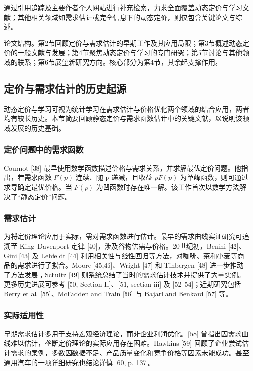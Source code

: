 通过引用追踪及主要作者个人网站进行补充检索，力求全面覆盖动态定价与学习文献；其他相关领域如需求估计或完全信息下的动态定价，则仅包含关键论文与综述。

论文结构。第2节回顾定价与需求估计的早期工作及其应用局限；第3节概述动态定价的一般文献与发展；第4节聚焦动态定价与学习的专门研究；第5节讨论与其他领域的联系；第6节展望新研究方向。核心部分为第4节，其余起支撑作用。


\subsection{定价与需求估计的历史起源}\label{historical-origins-of-pricing-and-demand-estimation}

动态定价与学习可视为统计学习在需求估计与价格优化两个领域的结合应用，两者均有较长历史。本节简要回顾静态定价与需求函数估计中的关键文献，以说明该领域发展的历史基础。

\subsubsection{定价问题中的需求函数}\label{demand-functions-in-pricing-problems}

Cournot [38] 最早使用数学函数描述价格与需求关系，并求解最优定价问题。他指出，若需求函数 \(F(p)\) 连续、随 p 递减，且收益 \(pF(p)\) 为单峰函数，则可通过求导确定最优价格。当 \(F(p)\) 为凹函数时存在唯一解。该工作首次以数学方法解决了“静态定价”问题。

\subsubsection{需求估计}\label{demand-estimation}

为将定价理论应用于实际，需对需求函数进行估计。最早的需求曲线实证研究可追溯至 King–Davenport 定律 [40]，涉及谷物供需与价格。20世纪初，Benini [42]、Gini [43] 及 Lehfeldt [44] 利用相关性与线性回归等方法，对咖啡、茶和小麦等商品的需求进行了拟合。Moore [45,46]、Wright [47] 和 Tinbergen [48] 进一步推动了方法发展；Schultz [49] 则系统总结了当时的需求估计技术并提供了大量实例。更多历史进展可参考 [50, Section II]、[51, section iii] 及 [52–54]；近期研究包括 Berry et al. [55]、McFadden and Train [56] 与 Bajari and Benkard [57] 等。

\subsubsection{实际适用性}\label{practical-applicability}

早期需求估计多用于支持宏观经济理论，而非企业利润优化。[58] 曾指出因需求曲线难以估计，垄断定价理论的实际应用存在困难。Hawkins [59] 回顾了企业尝试估计需求的案例，多数因数据不足、产品质量变化和竞争价格等因素未能成功。甚至通用汽车的一项详细研究也结论谨慎 [60, p. 137]。

